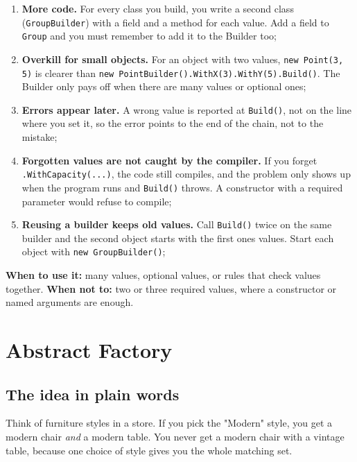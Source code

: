 \documentclass{utmreport}
\providecommand{\tightlist}{\setlength{\itemsep}{0pt}\setlength{\parskip}{0pt}}
\providecommand{\passthrough}[1]{#1}
\begin{document}
\begin{enumerate}
\def\labelenumi{\arabic{enumi}.}
\tightlist
\item \textbf{More code.} For every class you build, you write a second class (\passthrough{\lstinline!GroupBuilder!}) with a field and a method for each value. Add a field to \passthrough{\lstinline!Group!} and you must remember to add it to the Builder too;
\item \textbf{Overkill for small objects.} For an object with two values, \passthrough{\lstinline!new Point(3, 5)!} is clearer than \passthrough{\lstinline!new PointBuilder().WithX(3).WithY(5).Build()!}. The Builder only pays off when there are many values or optional ones;
\item \textbf{Errors appear later.} A wrong value is reported at \passthrough{\lstinline!Build()!}, not on the line where you set it, so the error points to the end of the chain, not to the mistake;
\item \textbf{Forgotten values are not caught by the compiler.} If you forget \passthrough{\lstinline!.WithCapacity(...)!}, the code still compiles, and the problem only shows up when the program runs and \passthrough{\lstinline!Build()!} throws. A constructor with a required parameter would refuse to compile;
\item \textbf{Reusing a builder keeps old values.} Call \passthrough{\lstinline!Build()!} twice on the same builder and the second object starts with the first one\textquotesingle s values. Start each object with \passthrough{\lstinline!new GroupBuilder()!};
\end{enumerate}

\textbf{When to use it:} many values, optional values, or rules that check values together. \textbf{When not to:} two or three required values, where a constructor or named arguments are enough.

\chapter{Abstract Factory}

\section{The idea in plain words}

Think of furniture styles in a store. If you pick the "Modern" style, you get a modern chair \emph{and} a modern table. You never get a modern chair with a vintage table, because one choice of style gives you the whole matching set.
\end{document}
